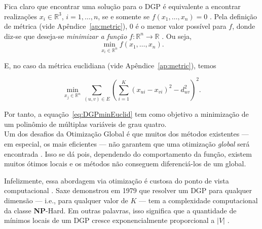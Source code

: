 Fica claro que encontrar uma solução para o DGP é equivalente a encontrar realizações $x_i \in \mathbb{R}^3$, $i=1,\dots,n$, se e somente se $f(x_1,\dots,x_n) = 0$ \cite{libertiEDG}. Pela definição de métrica (vide Apêndice~\ref{ap:metric}), 0 é o menor valor possível para $f$, donde diz-se que deseja-se \textit{minimizar a função} $f: \mathbb{R}^n \longrightarrow \mathbb{R}$ \cite{carlileBook31Coloquio}. Ou seja,
\begin{equation}
	\min_{x_i \in \mathbb{R}^n} f(x_1,\dots,x_n).
\end{equation}

E, no caso da métrica euclidiana (vide Apêndice~\ref{ap:metric}), temos

\begin{equation}
 \min_{x_j \in \mathbb{R}^n} \sum_{(u,v)\in E} \left(\sum_{i=1}^{K}(x_{ui} - x_{vi})^2 - d_{uv}^2\right)^2.
 \label{eq:DGPminEuclid}
\end{equation}

Por tanto, a equação~\ref{eq:DGPminEuclid} tem como objetivo a minimização de um polinômio de múltiplas variáveis de grau quatro. 
\\

Um dos desafios da Otimização Global é que muitos dos métodos existentes --- em especial, os mais eficientes --- não garantem que uma otimização \textit{global} será encontrada \cite{libertiEDG}. Isso se dá pois, dependendo do comportamento da função, existem muitos ótimos locais e os métodos não conseguem diferenciá-los de um global. %

Infelizmente, essa abordagem via otimização é custosa do ponto de vista computacional \cite{libertiEDG}. Saxe demonstrou em 1979 \cite{Saxe:79} que resolver um DGP para qualquer dimensão --- i.e., para qualquer valor de $K$ --- tem a complexidade computacional da classe \textbf{NP}-Hard. Em outras palavras, isso significa que a quantidade de mínimos locais de um DGP cresce exponencialmente proporcional a $|V|$ \cite{carlileIntroductionMDGP}. 

